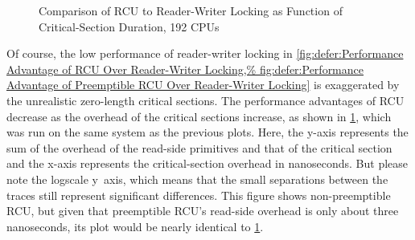 \begin{figure}
\centering
{}
\caption{Comparison of RCU to Reader-Writer Locking as Function of Critical-Section Duration, 192 CPUs}
\label{fig:defer:Comparison of RCU to Reader-Writer Locking as Function of Critical-Section Duration}
\end{figure}

Of course, the low performance of reader-writer locking in
\cref{fig:defer:Performance Advantage of RCU Over Reader-Writer Locking,%
fig:defer:Performance Advantage of Preemptible RCU Over Reader-Writer Locking}
is exaggerated by the unrealistic zero-length critical sections.
The performance advantages of RCU decrease as the overhead of the critical
sections increase, as shown in
\cref{fig:defer:Comparison of RCU to Reader-Writer Locking as Function of Critical-Section Duration},
which was run on the same system as the previous plots.
Here, the y-axis represents the sum of the overhead of the read-side
primitives and that of the critical section and the x-axis represents
the critical-section overhead in nanoseconds.
But please note the logscale y~axis, which means that the small
separations between the traces still represent significant differences.
This figure shows non-preemptible RCU, but given that preemptible RCU's
read-side overhead is only about three nanoseconds, its plot would be
nearly identical to
\cref{fig:defer:Comparison of RCU to Reader-Writer Locking as Function of Critical-Section Duration}.

